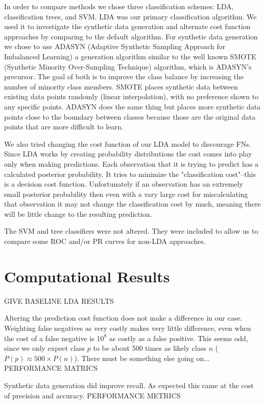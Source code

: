\documentclass{article}
\begin{document}
In order to compare methods we chose three classification schemes: LDA, classification trees, and SVM. LDA was our primary classification algorithm. We used it to investigate the synthetic data generation and alternate cost function approaches by comparing to the default algorithm.
For synthetic data generation we chose to use ADASYN (Adaptive Synthetic Sampling Approach for Imbalanced Learning) a generation algorithm similar to the well known SMOTE (Synthetic Minority Over-Sampling Technique) algorithm, which is ADASYN's precursor.
The goal of both is to improve the class balance by increasing the number of minority class members.
SMOTE places synthetic data between existing data points randomly (linear interpolation), with no preference shown to any specific points.
ADASYN does the same thing but places more synthetic data points close to the boundary between classes because those are the original data points that are more difficult to learn.

We also tried changing the cost function of our LDA model to discourage FNs.
Since LDA works by creating probability distributions the cost comes into play only when making predictions.
Each observation that it is trying to predict has a calculated posterior probability.
It tries to minimize the "classification cost"--this is a decision cost function.
Unfortunately if an observation has an extremely small posterior probability then even with a vary large cost for miscalculating that observation it may not change the classification cost by much, meaning there will be little change to the resulting prediction.

The SVM and tree classifiers were not altered. They were included to allow us to compare some ROC and/or PR curves for non-LDA approaches.

\section{Computational Results}

GIVE BASELINE LDA RESULTS

Altering the prediction cost function does not make a difference in our case.
Weighting false negatives as very costly makes very little difference, even when the cost of a false negative is $10^8$ as costly as a false positive.
This seems odd, since we only expect class $p$ to be about 500 times as likely class $n$ ($P(p) \approx 500 \times P(n)$).
There must be something else going on...
PERFORMANCE MATRICS

Synthetic data generation did improve recall. As expected this came at the cost of precision and accuracy.
PERFORMANCE METRICS
\end{document}
